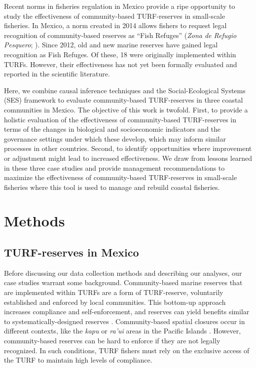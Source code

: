 \documentclass{frontiersSCNS}
\begin{document}
Recent norms in fisheries regulation in Mexico provide a ripe
opportunity to study the effectiveness of community-based TURF-reserves
in small-scale fisheries. In Mexico, a norm created in 2014 allows
fishers to request legal recognition of community-based reserves as
``Fish Refuges'' (\emph{Zona de Refugio Pesquero}; \citet{nom}). Since
2012, old and new marine reserves have gained legal recognition as Fish
Refuges. Of these, 18 were originally implemented within TURFs. However,
their effectiveness has not yet been formally evaluated and reported in
the scientific literature.

Here, we combine causal inference techniques and the Social-Ecological
Systems (SES) framework to evaluate community-based TURF-reserves in
three coastal communities in Mexico. The objective of this work is
twofold. First, to provide a holistic evaluation of the effectiveness of
community-based TURF-reserves in terms of the changes in biological and
socioeconomic indicators and the governance settings under which these
develop, which may inform similar processes in other countries. Second,
to identify opportunities where improvement or adjustment might lead to
increased effectiveness. We draw from lessons learned in these three
case studies and provide management recommendations to maximize the
effectiveness of community-based TURF-reserves in small-scale fisheries
where this tool is used to manage and rebuild coastal fisheries.

\hypertarget{methods}{%
\section{Methods}\label{methods}}

\hypertarget{turf-reserves-in-mexico}{%
\subsection{TURF-reserves in Mexico}\label{turf-reserves-in-mexico}}

Before discussing our data collection methods and describing our
analyses, our case studies warrant some background. Community-based
marine reserves that are implemented within TURFs are a form of
TURF-reserve, voluntarily established and enforced by local communities.
This bottom-up approach increases compliance and self-enforcement, and
reserves can yield benefits similar to systematically-designed reserves
\citep{beger_2004,smallhornwest_2018}. Community-based spatial closures
occur in different contexts, like the \emph{kapu} or \emph{ra'ui} areas
in the Pacific Islands \citep{johannes_2002,bohnsack_2004}. However,
community-based reserves can be hard to enforce if they are not legally
recognized. In such conditions, TURF fishers must rely on the exclusive
access of the TURF to maintain high levels of compliance.
\end{document}
